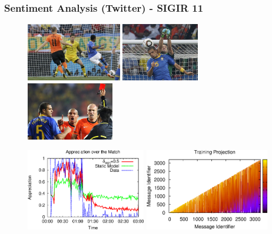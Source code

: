 \documentclass{beamer}
\begin{document}
\begin{frame}\frametitle{Sentiment Analysis (Twitter) - SIGIR 11}

\vspace{-0.1in}
\begin{figure}
\centering
\includegraphics[height=1.00in]{golrobinho.eps}
\includegraphics[height=1.00in]{contra.eps}
\includegraphics[height=1.00in]{vermelho.eps}
\end{figure}

\pause

\vspace{-0.15in}
\begin{figure}
\centering
\includegraphics[height=1.40in]{fmpos.eps}
\includegraphics[height=1.40in]{fmloc.eps}
\end{figure}

\end{frame}
\end{document}
